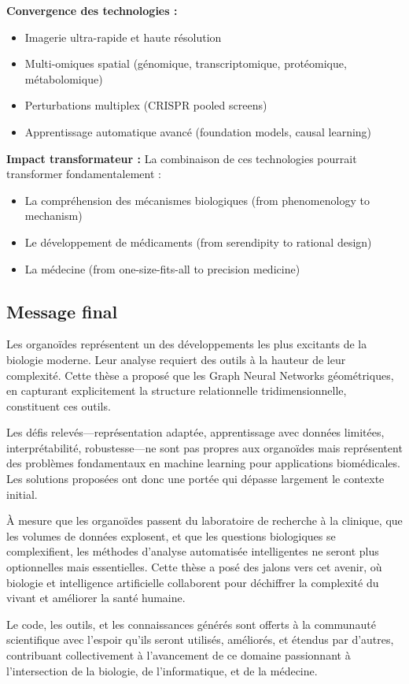 \textbf{Convergence des technologies :}
\begin{itemize}
    \item Imagerie ultra-rapide et haute résolution
    \item Multi-omiques spatial (génomique, transcriptomique, protéomique, métabolomique)
    \item Perturbations multiplex (CRISPR pooled screens)
    \item Apprentissage automatique avancé (foundation models, causal learning)
\end{itemize}

\textbf{Impact transformateur :}
La combinaison de ces technologies pourrait transformer fondamentalement :
\begin{itemize}
    \item La compréhension des mécanismes biologiques (from phenomenology to mechanism)
    \item Le développement de médicaments (from serendipity to rational design)
    \item La médecine (from one-size-fits-all to precision medicine)
\end{itemize}

\subsection{Message final}

Les organoïdes représentent un des développements les plus excitants de la biologie moderne. Leur analyse requiert des outils à la hauteur de leur complexité. Cette thèse a proposé que les Graph Neural Networks géométriques, en capturant explicitement la structure relationnelle tridimensionnelle, constituent ces outils.

Les défis relevés—représentation adaptée, apprentissage avec données limitées, interprétabilité, robustesse—ne sont pas propres aux organoïdes mais représentent des problèmes fondamentaux en machine learning pour applications biomédicales. Les solutions proposées ont donc une portée qui dépasse largement le contexte initial.

À mesure que les organoïdes passent du laboratoire de recherche à la clinique, que les volumes de données explosent, et que les questions biologiques se complexifient, les méthodes d'analyse automatisée intelligentes ne seront plus optionnelles mais essentielles. Cette thèse a posé des jalons vers cet avenir, où biologie et intelligence artificielle collaborent pour déchiffrer la complexité du vivant et améliorer la santé humaine.

Le code, les outils, et les connaissances générés sont offerts à la communauté scientifique avec l'espoir qu'ils seront utilisés, améliorés, et étendus par d'autres, contribuant collectivement à l'avancement de ce domaine passionnant à l'intersection de la biologie, de l'informatique, et de la médecine.

